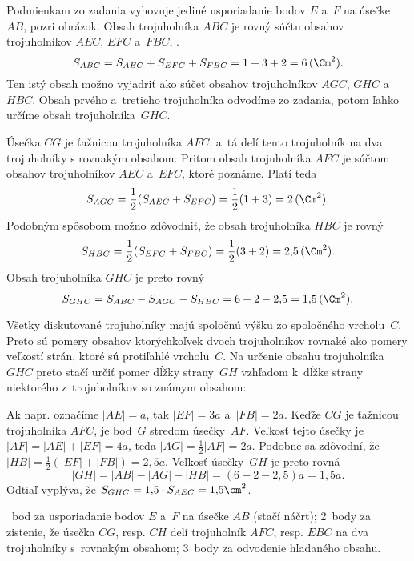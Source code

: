 {%
Podmienkam zo zadania vyhovuje jediné usporiadanie bodov $E$ a~$F$ na úsečke~$AB$, pozri obrázok.
Obsah trojuholníka $ABC$ je rovný súčtu obsahov trojuholníkov $AEC$, $EFC$
a~$FBC$, \tj.
$$
S_{ABC}
=S_{AEC}+S_{EFC}+S_{FBC}
=1+3+2=6\,(\Cm^2).
$$
Ten istý obsah možno vyjadriť ako súčet obsahov trojuholníkov $AGC$, $GHC$ a~$HBC$.
Obsah prvého a~tretieho trojuholníka odvodíme zo zadania, potom
ľahko určíme obsah trojuholníka~$GHC$.
%

Úsečka $CG$ je ťažnicou trojuholníka $AFC$, a~tá delí tento trojuholník na
dva trojuholníky s rovnakým obsahom.
Pritom obsah trojuholníka $AFC$ je súčtom obsahov trojuholníkov $AEC$ a~$EFC$, ktoré poznáme.
Platí teda
$$
S_{AGC}
=\frac12(S_{AEC}+S_{EFC})
=\frac12(1+3)=2\,(\Cm^2).
$$
Podobným spôsobom možno zdôvodniť, že obsah trojuholníka $HBC$ je rovný
$$
S_{HBC}
=\frac12(S_{EFC}+S_{FBC})
=\frac12(3+2)
=2{,}5\,(\Cm^2).
$$
Obsah trojuholníka $GHC$ je preto rovný
$$
S_{GHC}
=S_{ABC}-S_{AGC}-S_{HBC}
=6-2-2{,}5=1{,}5\,(\Cm^2).
$$


\poznamka
Všetky diskutované trojuholníky majú spoločnú výšku zo spoločného vrcholu~$C$.
Preto sú pomery obsahov ktorýchkoľvek dvoch trojuholníkov rovnaké ako pomery
veľkostí strán, ktoré sú protiľahlé vrcholu~$C$.
Na určenie obsahu trojuholníka $GHC$ preto stačí určiť pomer dĺžky strany~$GH$
vzhľadom k~dĺžke strany niektorého z~trojuholníkov so známym obsahom:

Ak napr. označíme $|AE|=a$, tak $|EF|=3a$ a~$|FB|=2a$.
Keďže $CG$ je ťažnicou trojuholníka $AFC$, je bod~$G$ stredom úsečky~$AF$.
Veľkosť tejto úsečky je $|AF|=|AE|+|EF|=4a$, teda $|AG|=\frac12|AF|=2a$.
Podobne sa zdôvodní, že $|HB|=\frac12(|EF|+|FB|)=2{,}5a$.
Veľkosť úsečky~$GH$ je preto rovná
$$
|GH|=|AB|-|AG|-|HB|=(6-2-2{,}5)a=1{,}5a.$$
Odtiaľ vyplýva, že
$S_{GHC}=1{,}5\cdot S_{AEC}=1{,}5\cm^2$.

~bod za usporiadanie bodov $E$ a~$F$ na úsečke $AB$ (stačí náčrt);
2~body za zistenie, že úsečka $CG$, resp. $CH$ delí trojuholník $AFC$, resp.
$EBC$ na dva trojuholníky s~rovnakým obsahom;
3~body za odvodenie hľadaného obsahu.
\endhodnotenie
}

